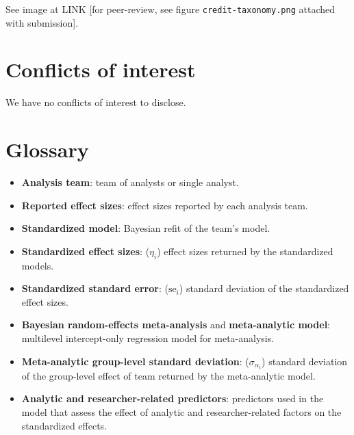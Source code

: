 \documentclass[Review,times,sageh]{sagej}
\providecommand{\tightlist}{\setlength{\itemsep}{0pt}\setlength{\parskip}{0pt}}
\begin{document}
See image at LINK {[}for peer-review, see figure \texttt{credit-taxonomy.png} attached with submission{]}.

\hypertarget{conflicts-of-interest}{%
\section{Conflicts of interest}\label{conflicts-of-interest}}

We have no conflicts of interest to disclose.

\appendix

\hypertarget{glossary}{%
\section{Glossary}\label{glossary}}

\begin{itemize}
\tightlist
\item
  \textbf{Analysis team}: team of analysts or single analyst.
\item
  \textbf{Reported effect sizes}: effect sizes reported by each analysis team.
\item
  \textbf{Standardized model}: Bayesian refit of the team's model.
\item
  \textbf{Standardized effect sizes}: (\(\eta_i\)) effect sizes returned by the standardized models.
\item
  \textbf{Standardized standard error}: (\(\text{se}_i\)) standard deviation of the standardized effect sizes.
\item
  \textbf{Bayesian random-effects meta-analysis} and \textbf{meta-analytic model}: multilevel intercept-only regression model for meta-analysis.
\item
  \textbf{Meta-analytic group-level standard deviation}: (\(\sigma_{\alpha_{\text{t}}}\)) standard deviation of the group-level effect of team returned by the meta-analytic model.
\item
  \textbf{Analytic and researcher-related predictors}: predictors used in the model that assess the effect of analytic and researcher-related factors on the standardized effects.
\end{itemize}



\end{document}
